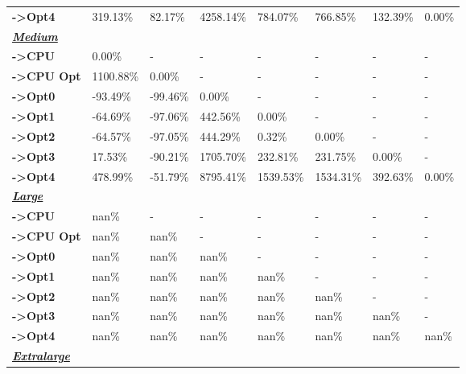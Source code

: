 \begin{table}[H]
\begin{tabular}{llllllll}
    \rowcolor[HTML]{EFEFEF} \cellcolor[HTML]{DAE8FC} \textbf{->Opt4} & 319.13\% & 82.17\% & 4258.14\% & 784.07\% & 766.85\% & 	132.39\% & 	0.00\% \\
    \cellcolor[HTML]{DAE8FC} \textbf{\textbf{{\emph{{\underline{{Medium}}}}}}} &  &  &  &  &  &  &  \\
    \rowcolor[HTML]{EFEFEF} \cellcolor[HTML]{DAE8FC} \textbf{->CPU} & 0.00\% & - & - & - & - & - & - \\
    \cellcolor[HTML]{DAE8FC} \textbf{->CPU Opt} & 1100.88\% & 0.00\% & - & - & - & - & - \\
    \rowcolor[HTML]{EFEFEF} \cellcolor[HTML]{DAE8FC} \textbf{->Opt0} & -93.49\% & -99.46\% & 0.00\% & - & - & - & - \\
    \cellcolor[HTML]{DAE8FC} \textbf{->Opt1} & -64.69\% & -97.06\% & 442.56\% & 0.00\% & - & - & - \\
    \rowcolor[HTML]{EFEFEF} \cellcolor[HTML]{DAE8FC} \textbf{->Opt2} & -64.57\% & -97.05\% & 444.29\% & 0.32\% & 0.00\% & - & - \\
    \cellcolor[HTML]{DAE8FC} \textbf{->Opt3} & 17.53\% & -90.21\% & 1705.70\% & 232.81\% & 231.75\% & 	0.00\% & - \\
    \rowcolor[HTML]{EFEFEF} \cellcolor[HTML]{DAE8FC} \textbf{->Opt4} & 478.99\% & -51.79\% & 8795.41\% & 1539.53\% & 1534.31\% & 	392.63\% & 	0.00\% \\
    \cellcolor[HTML]{DAE8FC} \textbf{\textbf{{\emph{{\underline{{Large}}}}}}} &  &  &  &  &  &  &  \\
    \rowcolor[HTML]{EFEFEF} \cellcolor[HTML]{DAE8FC} \textbf{->CPU} & nan\% & - & - & - & - & - & - \\
    \cellcolor[HTML]{DAE8FC} \textbf{->CPU Opt} & nan\% & nan\% & - & - & - & - & - \\
    \rowcolor[HTML]{EFEFEF} \cellcolor[HTML]{DAE8FC} \textbf{->Opt0} & nan\% & nan\% & nan\% & - & - & - & - \\
    \cellcolor[HTML]{DAE8FC} \textbf{->Opt1} & nan\% & nan\% & nan\% & nan\% & - & - & - \\
    \rowcolor[HTML]{EFEFEF} \cellcolor[HTML]{DAE8FC} \textbf{->Opt2} & nan\% & nan\% & nan\% & nan\% & nan\% & - & - \\
    \cellcolor[HTML]{DAE8FC} \textbf{->Opt3} & nan\% & nan\% & nan\% & nan\% & nan\% & 	nan\% & - \\
    \rowcolor[HTML]{EFEFEF} \cellcolor[HTML]{DAE8FC} \textbf{->Opt4} & nan\% & nan\% & nan\% & nan\% & nan\% & 	nan\% & 	nan\% \\
    \cellcolor[HTML]{DAE8FC} \textbf{\textbf{{\emph{{\underline{{Extralarge}}}}}}} &  &  &  &  &  &  &  \\

\end{tabular}
\end{table}
